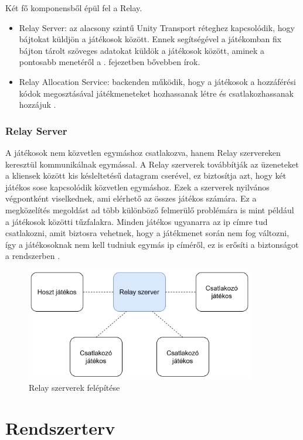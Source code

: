 \documentclass[]{thesis-ekf}
\theoremstyle{definition}
\theoremstyle{remark}
\begin{document}
Két fő komponensből épül fel a Relay.

\begin{itemize}
	\item Relay Server: az alacsony szintű Unity Transport réteghez kapcsolódik, hogy bájtokat küldjön a játékosok között. Ennek segítségével a játékomban fix bájton tárolt szöveges adatokat küldök a játékosok között, aminek a pontosabb menetéről a . fejezetben bővebben írok.
	\item Relay Allocation Service: backenden működik, hogy a játékosok a hozzáférési kódok megosztásával játékmeneteket hozhassanak létre és csatlakozhassanak hozzájuk \cite{UnityAllocationsService}.
\end{itemize}

\subsection{Relay Server}

A játékosok nem közvetlen egymáshoz csatlakozva, hanem Relay szervereken keresztül kommunikálnak egymással. A Relay szerverek továbbítják az üzeneteket a kliensek között kis késleltetésű datagram cserével, ez biztosítja azt, hogy két játékos sose kapcsolódik közvetlen egymáshoz. Ezek a szerverek nyilvános végpontként viselkednek, ami elérhető az összes játékos számára. Ez a megközelítés megoldást ad több különböző felmerülő problémára is mint például a játékosok közötti tűzfalakra. Minden játékos ugyanarra az ip címre tud csatlakozni, amit biztosra vehetnek, hogy a játékmenet során nem fog változni, így a játékosoknak nem kell tudniuk egymás ip címéről, ez is erősíti a biztonságot a rendszerben \cite{UnityRelayServers}.

\begin{figure}[ht!]
	\centering
	\includegraphics[width=10cm]{RelayServer}
	\caption{Relay szerverek felépítése}
	\label{fig-unityrelayservers}
\end{figure}

\chapter{Rendszerterv}
\label{ch-rendszerterv}
\end{document}
